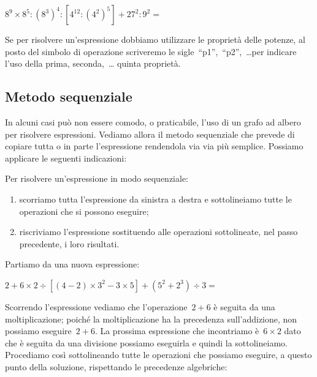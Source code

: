 \begin{esempio}{}{}
  \(8^9 \times 8^5 : (8^3)^4 : [4^{12} : (4^2)^5] + 27^2 : 9^2 =\)

Se per risolvere un'espressione dobbiamo utilizzare le proprietà delle 
potenze, al posto del simbolo di operazione scriveremo le 
sigle~``p1'',~``p2'',~\dots per indicare l'uso della prima, seconda,~\dots
quinta proprietà.

\begin{inaccessibleblock}[]
 \begin{center}
 \begin{center} \espalberob \end{center}
 \end{center}
\end{inaccessibleblock}
 \end{esempio}

\subsection{Metodo sequenziale}

In alcuni casi può non essere comodo, o praticabile, l'uso di un grafo ad 
albero per risolvere espressioni. 
Vediamo allora il metodo sequenziale che prevede di copiare tutta o in 
parte l'espressione rendendola via via più semplice. 
Possiamo applicare le seguenti indicazioni:

\begin{procedura}{}{}
 Per risolvere un'espressione in modo sequenziale:
\begin{enumerate} [noitemsep] 
 \item scorriamo tutta l'espressione da sinistra a destra 
 e sottolineiamo tutte le operazioni che si possono eseguire;
 \item riscriviamo l'espressione sostituendo alle operazioni sottolineate,
 nel passo precedente, i loro risultati.
\end{enumerate}
\end{procedura}

Partiamo da una nuova espressione:

\(2 + 6 \times 2 \div 
 \left[ \left(4 -2 \right) \times 3^{2} - 3 \times 5 \right] +
 \left( 5^{2} + 2^{3} \right) \div 3 =\)
 
Scorrendo l'espressione vediamo che l'operazione~\(2 + 6\) è seguita da una 
moltiplicazione; poiché la moltiplicazione ha la precedenza sull'addizione,
non possiamo eseguire~\(2 + 6\). La prossima espressione che incontriamo 
è~\(6 \times 2\) dato che è seguita da una divisione possiamo eseguirla e 
quindi la sottolineiamo. Procediamo così sottolineando tutte le operazioni
che possiamo eseguire, a questo punto della soluzione, rispettando le
precedenze algebriche:

